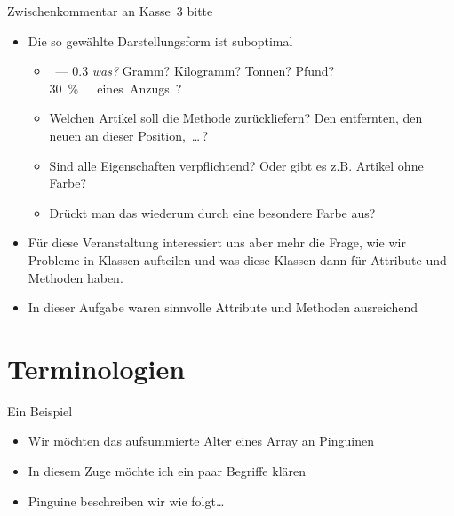 {\iffull
{\AddonFrame
\begin{frame}{Zwischenkommentar an Kasse~3 bitte}
    \begin{itemize}[<+(1)->]
        \itemsep5pt
        \item Die so gewählte Darstellungsform ist suboptimal \begin{itemize}
            \itemsep3pt
            \item {}~--- \num{0.3} \textit{was?} Gramm? Kilogramm? Tonnen? Pfund? \qty{30}\percent\ eines Anzugs?
            \item Welchen Artikel soll die Methode  zurückliefern? Den entfernten, den neuen an dieser Position,~\ldots\,?
            \item Sind alle Eigenschaften verpflichtend? Oder gibt es z.B. Artikel ohne Farbe?
            \item Drückt man das wiederum durch eine besondere Farbe aus?
        \end{itemize}
        \item Für diese Veranstaltung interessiert uns aber mehr die Frage, wie wir Probleme in Klassen aufteilen und was diese Klassen dann für Attribute und Methoden haben.
        \item In dieser Aufgabe waren  sinnvolle Attribute und Methoden ausreichend
    \end{itemize}
\end{frame}
}
\fi
}




\section{Terminologien}
\iffull
\begin{frame}[fragile]{Ein Beispiel}
\begin{itemize}[<+(1)->]
    \itemsep8pt
    \item Wir möchten das aufsummierte Alter eines Array an Pinguinen
    \item In diesem Zuge möchte ich ein paar Begriffe klären
    \item Pinguine beschreiben wir  wie folgt\ldots
\end{itemize}
\end{frame}
\fi

